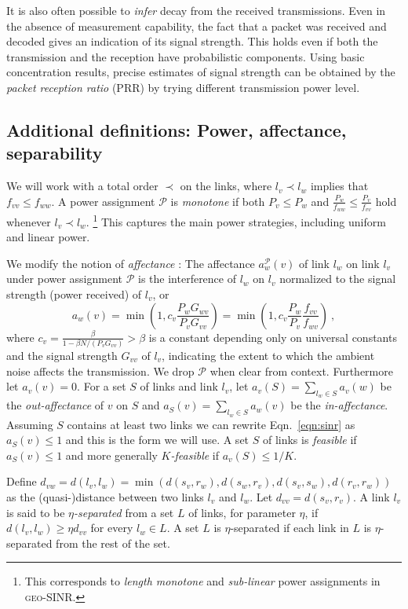 \documentclass[11pt]{amsart}
\newcounter{foo}
\def\calP{{\mathcal{P}}}
\newcommand{\geomodel}{\textsc{geo-SINR}}
\begin{document}
It is also often possible to \emph{infer} decay from the received transmissions.
Even in the absence of measurement capability, the fact that a packet
was received and decoded gives an indication of its signal strength.
This holds even if both the transmission and the reception have
probabilistic components.
Using basic concentration results, 
precise estimates of signal strength
can be obtained by the \emph{packet reception ratio} (PRR)
by trying different transmission power level.
\fi

\subsection{Additional definitions: Power, affectance, separability}


We will work with a total order $\prec$ on the links, where $l_v \prec l_w$ implies that $f_{vv} \le f_{ww}$. 
A power assignment $\calP$ is \emph{monotone} if both $P_v \le P_w$
and $\frac{P_w}{f_{ww}} \le \frac{P_v}{f_{vv}}$ hold whenever $l_v \prec l_w$.
\footnote{This corresponds to \emph{length monotone} and
  \emph{sub-linear} power assignments in {\geomodel}.} This captures
the main power strategies, including uniform and linear power.


We modify the notion of \emph{affectance} \cite{GHWW09,HW09,KV10}:
The affectance $a^{\calP}_w(v)$ of link $l_w$ on link $l_v$ under power assignment $\calP$  is the interference of $l_w$ on $l_v$ normalized to the signal strength (power received) of $l_v$, or
\[
a_w(v) = \min \left(1, c_v \frac{P_w G_{wv}}{P_v G_{vv}}\right) = \min \left(1, c_v \frac{P_w}{P_v} \frac{f_{vv}}{f_{wv}}\right)\ ,
\]
where $c_v= \frac{\beta}{1-\beta N/(P_v G_{vv})} > \beta$ is a constant depending only on universal constants and the signal strength $G_{vv}$ of $l_v$, indicating the extent to which the ambient noise affects the transmission. 
We drop $\calP$ when clear from context.
Furthermore let $a_v(v) = 0$. For a set $S$ of links and link $l_v$, let $a_v(S) = \sum_{l_w \in S} a_v(w)$ be the \emph{out-affectance} of $v$ on $S$ and $a_S(v) = \sum_{l_w \in S} a_w(v)$ be the \emph{in-affectance}.
Assuming $S$ contains at least two links we can rewrite Eqn.~\ref{eqn:sinr} as $a_S(v) \leq 1$ and this is the form we will use.
A set $S$ of links is \emph{feasible} if $a_S(v) \leq 1$ 
and more generally \emph{$K$-feasible} if $a_v(S) \le 1/K$.






Define $d_{vw} = d(l_v,l_w) = \min(d(s_v,r_w),d(s_w,r_v), d(s_v,s_w),d(r_v,r_w))$ as the (quasi-)distance between two links $l_v$ and $l_w$.
Let $d_{vv} = d(s_v,r_v)$.
A link $l_v$ is said to be \emph{$\eta$-separated} from a set $L$ of links, for
parameter $\eta$, if $d(l_v,l_w) \ge \eta d_{vv}$ for every $l_w \in
L$.  A set $L$ is $\eta$-separated if each link in $L$ is
$\eta$-separated from the rest of the set.
\end{document}
